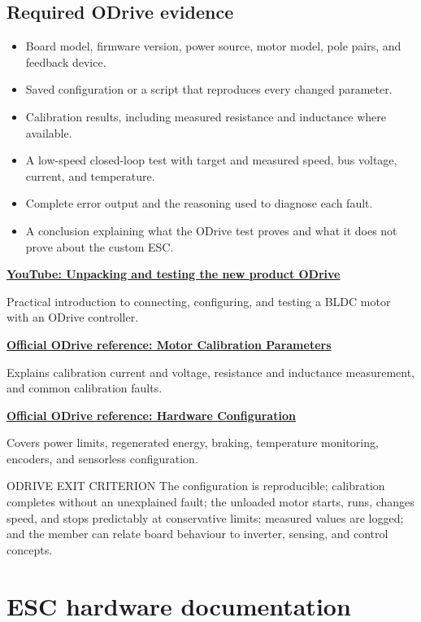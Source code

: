 \documentclass[11pt,a4paper]{article}
\newcommand{\Resource}[3]{%
  \begin{resourcebox}
    \href{#2}{\textbf{\color{DARESTeal}#1}}\par
    {\small #3}
  \end{resourcebox}
}
\begin{document}
\subsection{Required ODrive evidence}

\begin{itemize}
  \item Board model, firmware version, power source, motor model, pole pairs, and feedback device.
  \item Saved configuration or a script that reproduces every changed parameter.
  \item Calibration results, including measured resistance and inductance where available.
  \item A low-speed closed-loop test with target and measured speed, bus voltage, current, and temperature.
  \item Complete error output and the reasoning used to diagnose each fault.
  \item A conclusion explaining what the ODrive test proves and what it does not prove about the custom ESC.
\end{itemize}

\Resource
  {YouTube: Unpacking and testing the new product ODrive}
  {https://www.youtube.com/watch?v=DVN25PbMfDE\&list=PLc2RScfrSFEDcQp6Qvc7mBNre8ABCoz9p}
  {Practical introduction to connecting, configuring, and testing a BLDC motor with an ODrive controller.}

\Resource
  {Official ODrive reference: Motor Calibration Parameters}
  {https://docs.odriverobotics.com/v/latest/articles/motor-parameters.html}
  {Explains calibration current and voltage, resistance and inductance measurement, and common calibration faults.}

\Resource
  {Official ODrive reference: Hardware Configuration}
  {https://docs.odriverobotics.com/v/latest/manual/hardware-config.html}
  {Covers power limits, regenerated energy, braking, temperature monitoring, encoders, and sensorless configuration.}

\begin{warningbox}{ODRIVE EXIT CRITERION}
  The configuration is reproducible; calibration completes without an
  unexplained fault; the unloaded motor starts, runs, changes speed, and stops
  predictably at conservative limits; measured values are logged; and the
  member can relate board behaviour to inverter, sensing, and control concepts.
\end{warningbox}

\section{ESC hardware documentation}
\end{document}
